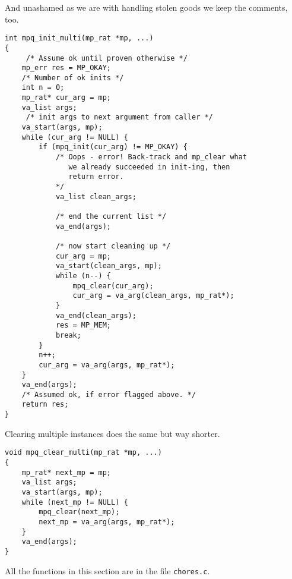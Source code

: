 \documentclass[10pt]{book}
\newcommand{\code}[1]{{\texttt{#1}}}
\theoremstyle{definition}
\theoremstyle{remark}
\begin{document}
And unashamed as we are with handling stolen goods we keep the comments, too.
 \begin{center}
    \begin{lstlisting}[caption={Initializing Multiple Instances},label=initratmult]
int mpq_init_multi(mp_rat *mp, ...)
{   
     /* Assume ok until proven otherwise */
    mp_err res = MP_OKAY;
    /* Number of ok inits */
    int n = 0;
    mp_rat* cur_arg = mp;
    va_list args;
     /* init args to next argument from caller */
    va_start(args, mp);
    while (cur_arg != NULL) {
        if (mpq_init(cur_arg) != MP_OKAY) {
            /* Oops - error! Back-track and mp_clear what
               we already succeeded in init-ing, then
               return error.
            */
            va_list clean_args;

            /* end the current list */
            va_end(args);

            /* now start cleaning up */
            cur_arg = mp;
            va_start(clean_args, mp);
            while (n--) {
                mpq_clear(cur_arg);
                cur_arg = va_arg(clean_args, mp_rat*);
            }
            va_end(clean_args);
            res = MP_MEM;
            break;
        }
        n++;
        cur_arg = va_arg(args, mp_rat*);
    }
    va_end(args);
    /* Assumed ok, if error flagged above. */
    return res;
}
    \end{lstlisting}
  \end{center}
Clearing multiple instances does the same but way shorter.
 \begin{center}
    \begin{lstlisting}[caption={Clearing Multiple Instances},label=clearratmult]
void mpq_clear_multi(mp_rat *mp, ...)
{
    mp_rat* next_mp = mp;
    va_list args;
    va_start(args, mp);
    while (next_mp != NULL) {
        mpq_clear(next_mp);
        next_mp = va_arg(args, mp_rat*);
    }
    va_end(args);
}
    \end{lstlisting}
  \end{center}
All the functions in this section are in the file \code{chores.c}.
\end{document}
